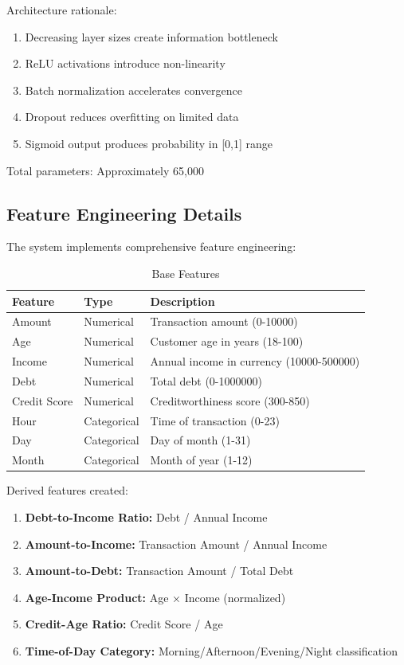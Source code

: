 \documentclass[12pt,a4paper,twoside]{report}
\begin{document}
Architecture rationale:

\begin{enumerate}
    \item Decreasing layer sizes create information bottleneck
    \item ReLU activations introduce non-linearity
    \item Batch normalization accelerates convergence
    \item Dropout reduces overfitting on limited data
    \item Sigmoid output produces probability in [0,1] range
\end{enumerate}

Total parameters: Approximately 65,000

\subsection{Feature Engineering Details}

The system implements comprehensive feature engineering:

\begin{table}[H]
    \centering
    \begin{tabular}{|l|l|l|}
        \hline
        \textbf{Feature} & \textbf{Type} & \textbf{Description} \\
        \hline
        Amount & Numerical & Transaction amount (0-10000) \\
        Age & Numerical & Customer age in years (18-100) \\
        Income & Numerical & Annual income in currency (10000-500000) \\
        Debt & Numerical & Total debt (0-1000000) \\
        Credit Score & Numerical & Creditworthiness score (300-850) \\
        Hour & Categorical & Time of transaction (0-23) \\
        Day & Categorical & Day of month (1-31) \\
        Month & Categorical & Month of year (1-12) \\
        \hline
    \end{tabular}
    \caption{Base Features}
\end{table}

Derived features created:

\begin{enumerate}
    \item \textbf{Debt-to-Income Ratio:} Debt / Annual Income
    \item \textbf{Amount-to-Income:} Transaction Amount / Annual Income
    \item \textbf{Amount-to-Debt:} Transaction Amount / Total Debt
    \item \textbf{Age-Income Product:} Age × Income (normalized)
    \item \textbf{Credit-Age Ratio:} Credit Score / Age
    \item \textbf{Time-of-Day Category:} Morning/Afternoon/Evening/Night classification
\end{enumerate}
\end{document}
